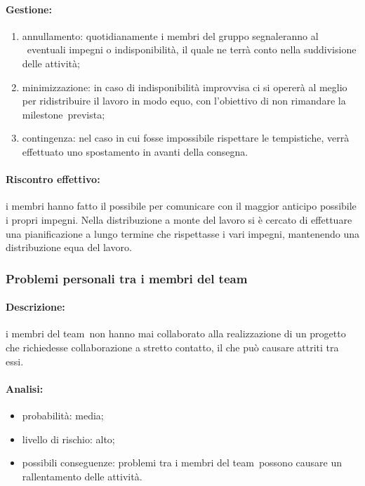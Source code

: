 \documentclass[../PianoProgetto.tex]{subfiles}
\begin{document}
	\paragraph*{Gestione:}
	\begin{enumerate}
		\item annullamento: quotidianamente i membri del gruppo segnaleranno al \responsabilediprogetto\ eventuali impegni o indisponibilità, il quale ne terrà conto nella suddivisione delle attività;
		\item minimizzazione: in caso di indisponibilità improvvisa ci si opererà al meglio per ridistribuire il lavoro in modo equo, con l'obiettivo di non rimandare la milestone\g\ prevista;
		\item contingenza: nel caso in cui fosse impossibile rispettare le tempistiche, verrà effettuato uno spostamento in avanti della consegna.
	\end{enumerate}
			
	\paragraph*{Riscontro effettivo:} i membri hanno fatto il possibile per comunicare con il maggior anticipo possibile i propri impegni. Nella distribuzione a monte del lavoro si è cercato di effettuare una pianificazione a lungo termine che rispettasse i vari impegni, mantenendo una distribuzione equa del lavoro.
	
\subsubsection{Problemi personali tra i membri del team}

	\paragraph*{Descrizione:} i membri del team\g\ non hanno mai collaborato alla realizzazione di un progetto che richiedesse collaborazione a stretto contatto, il che può causare attriti tra essi.
	
	\paragraph*{Analisi:}
	\begin{itemize}
		\item probabilità: media;
		\item livello di rischio: alto;
		\item possibili conseguenze: problemi tra i membri del team\g\ possono causare un rallentamento delle attività.
	\end{itemize}
	
\end{document}
